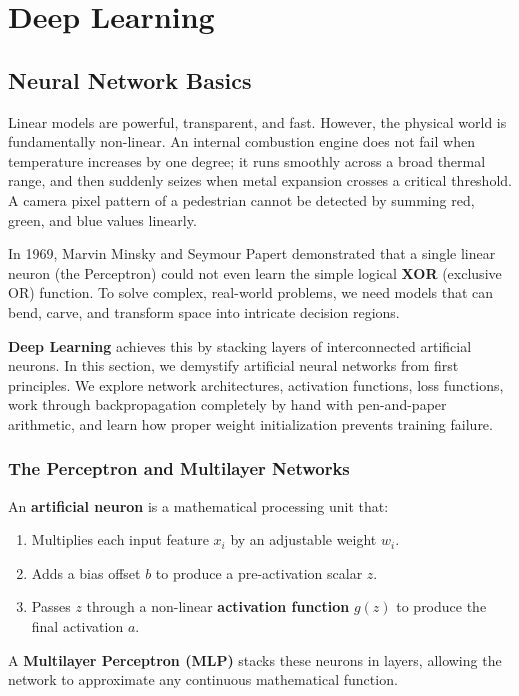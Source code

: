 \chapter{Deep Learning}\label{ch:deep_learning}
\section{Neural Network Basics}\label{sec:neural_network_basics}

Linear models are powerful, transparent, and fast. However, the physical world is fundamentally non-linear. An internal combustion engine does not fail when temperature increases by one degree; it runs smoothly across a broad thermal range, and then suddenly seizes when metal expansion crosses a critical threshold. A camera pixel pattern of a pedestrian cannot be detected by summing red, green, and blue values linearly.

In 1969, Marvin Minsky and Seymour Papert demonstrated that a single linear neuron (the Perceptron) could not even learn the simple logical \textbf{XOR} (exclusive OR) function. To solve complex, real-world problems, we need models that can bend, carve, and transform space into intricate decision regions. 

\textbf{Deep Learning} achieves this by stacking layers of interconnected artificial neurons. In this section, we demystify artificial neural networks from first principles. We explore network architectures, activation functions, loss functions, work through backpropagation completely by hand with pen-and-paper arithmetic, and learn how proper weight initialization prevents training failure.

\subsection{The Perceptron and Multilayer Networks}

\begin{keyidea}
An \textbf{artificial neuron} is a mathematical processing unit that:
\begin{enumerate}
    \item Multiplies each input feature $x_i$ by an adjustable weight $w_i$.
    \item Adds a bias offset $b$ to produce a pre-activation scalar $z$.
    \item Passes $z$ through a non-linear \textbf{activation function} $g(z)$ to produce the final activation $a$.
\end{enumerate}
A \textbf{Multilayer Perceptron (MLP)} stacks these neurons in layers, allowing the network to approximate any continuous mathematical function.
\end{keyidea}

